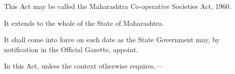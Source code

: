 \documentclass[reprint]{mhact}
\begin{document}
      

      

      \begin{subsectionlist}

         This Act may be called the Maharashtra
        Co-operative Societies Act, 1960.

         It extends to the whole of the State of
        Maharashtra.

         It shall come into force on such date
        as the State Government may, by notification in the Official
        Gazette, appoint.

       \end{subsectionlist}
     
      
      In this Act, unless the context otherwise requires,---
\end{document}
